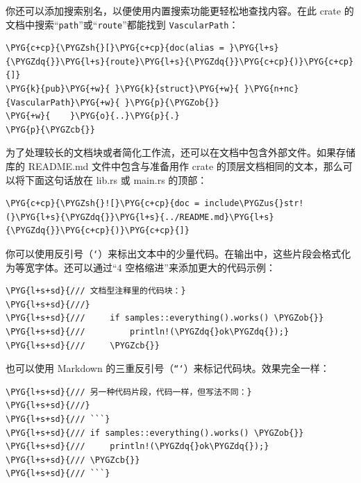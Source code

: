 你还可以添加搜索别名，以便使用内置搜索功能更轻松地查找内容。在此 crate 的文档中搜索“\texttt{path}”或“\texttt{route}”都能找到 \texttt{VascularPath}：

\begin{Verbatim}[commandchars=\\\{\},breaklines=true,breakanywhere=true,fontsize=\codefont,xleftmargin=17bp]
\PYG{c+cp}{\PYGZsh{}[}\PYG{c+cp}{doc(alias = }\PYG{l+s}{\PYGZdq{}}\PYG{l+s}{route}\PYG{l+s}{\PYGZdq{}}\PYG{c+cp}{)}\PYG{c+cp}{]}
\PYG{k}{pub}\PYG{+w}{ }\PYG{k}{struct}\PYG{+w}{ }\PYG{n+nc}{VascularPath}\PYG{+w}{ }\PYG{p}{\PYGZob{}}
\PYG{+w}{    }\PYG{o}{..}\PYG{p}{.}
\PYG{p}{\PYGZcb{}}
\end{Verbatim}

为了处理较长的文档块或者简化工作流，还可以在文档中包含外部文件。如果存储库的 README.md 文件中包含与准备用作 crate 的顶层文档相同的文本，那么可以将下面这句话放在 lib.rs 或 main.rs 的顶部：

\begin{Verbatim}[commandchars=\\\{\},breaklines=true,breakanywhere=true,fontsize=\codefont,xleftmargin=17bp]
\PYG{c+cp}{\PYGZsh{}![}\PYG{c+cp}{doc = include\PYGZus{}str!(}\PYG{l+s}{\PYGZdq{}}\PYG{l+s}{../README.md}\PYG{l+s}{\PYGZdq{}}\PYG{c+cp}{)}\PYG{c+cp}{]}
\end{Verbatim}

你可以使用反引号（\texttt{`}）来标出文本中的少量代码。在输出中，这些片段会格式化为等宽字体。还可以通过“4 空格缩进”来添加更大的代码示例：

\begin{Verbatim}[commandchars=\\\{\},breaklines=true,breakanywhere=true,fontsize=\codefont,xleftmargin=17bp]
\PYG{l+s+sd}{/// 文档型注释里的代码块：}
\PYG{l+s+sd}{///}
\PYG{l+s+sd}{///     if samples::everything().works() \PYGZob{}}
\PYG{l+s+sd}{///         println!(\PYGZdq{}ok\PYGZdq{});}
\PYG{l+s+sd}{///     \PYGZcb{}}
\end{Verbatim}

也可以使用 Markdown 的三重反引号（\texttt{```}）来标记代码块。效果完全一样：

\begin{Verbatim}[commandchars=\\\{\},breaklines=true,breakanywhere=true,fontsize=\codefont,xleftmargin=17bp]
\PYG{l+s+sd}{/// 另一种代码片段，代码一样，但写法不同：}
\PYG{l+s+sd}{///}
\PYG{l+s+sd}{/// ```}
\PYG{l+s+sd}{/// if samples::everything().works() \PYGZob{}}
\PYG{l+s+sd}{///     println!(\PYGZdq{}ok\PYGZdq{});}
\PYG{l+s+sd}{/// \PYGZcb{}}
\PYG{l+s+sd}{/// ```}
\end{Verbatim}


